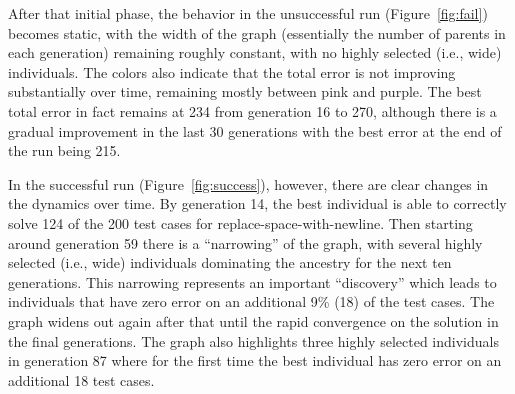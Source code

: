 \documentclass{sig-alternate}
\begin{document}
After that initial phase, the behavior in the unsuccessful run (Figure~\ref{fig:fail}) becomes static, with the width of the graph (essentially the number of parents in each generation) remaining roughly constant, with no highly selected (i.e., wide) individuals. The colors also indicate that the total error is not improving substantially over time, remaining mostly between pink and purple. The best total error in fact remains at 234 from generation 16 to 270, although there is a gradual improvement in the last 30 generations with the best error at the end of the run being 215.

In the successful run (Figure~\ref{fig:success}), however, there are clear changes in the dynamics over time. By generation 14, the best individual is able to correctly solve 124 of the 200 test cases for replace-space-with-newline. Then starting around generation 59 there is a ``narrowing'' of the graph, with several highly selected (i.e., wide) individuals dominating the ancestry for the next ten generations. This narrowing represents an important ``discovery'' which leads to individuals that have zero error on an additional 9\% (18) of the test cases. The graph widens out again after that until the rapid convergence on the solution in the final generations. The graph also highlights three highly selected individuals in generation 87 where for the first time the best individual has zero error on an additional 18 test cases.



\end{document}
